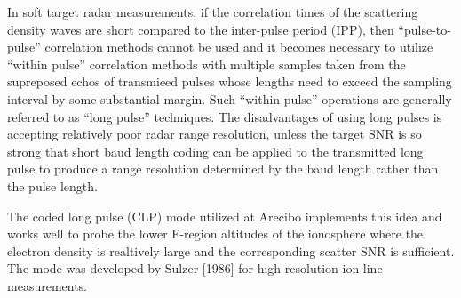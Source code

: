 In soft target radar measurements, if the correlation times of the scattering density waves are short compared to the inter-pulse period (IPP), then ``pulse-to-pulse'' correlation methods cannot be used and it becomes necessary to utilize ``within pulse'' correlation methods with multiple samples taken from the supreposed echos of transmieed pulses whose lengths need to exceed the sampling interval by some substantial margin. Such ``within pulse'' operations are generally referred to as ``long pulse'' techniques. The disadvantages of using long pulses is accepting relatively poor radar range resolution, unless the target SNR is so strong that short baud length coding can be applied to the transmitted long pulse to produce a range resolution determined by the baud length rather than the pulse length.

The coded long pulse (CLP) mode utilized at Arecibo implements this idea and works well to probe the lower F-region altitudes of the ionosphere where the electron density is realtively large and the corresponding scatter SNR is sufficient. The mode was developed by Sulzer [1986] for high-resolution ion-line measurements.